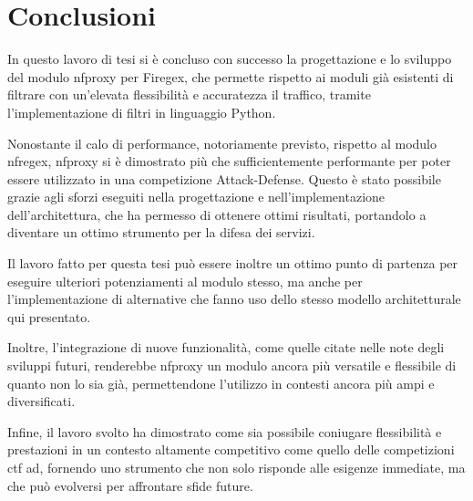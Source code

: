 \chapter*{Conclusioni}\label{chap:ending}

In questo lavoro di tesi si è concluso con successo la progettazione e lo sviluppo del modulo \gls{nfproxy} per Firegex, che permette rispetto ai moduli già esistenti di filtrare con un'elevata flessibilità e accuratezza il traffico, tramite l'implementazione di filtri in linguaggio Python.

Nonostante il calo di performance, notoriamente previsto, rispetto al modulo \gls{nfregex}, \gls{nfproxy} si è dimostrato più che sufficientemente performante per poter essere utilizzato in una competizione Attack-Defense. Questo è stato possibile grazie agli sforzi eseguiti nella progettazione e nell'implementazione dell'architettura, che ha permesso di ottenere ottimi risultati, portandolo a diventare un ottimo strumento per la difesa dei servizi.

Il lavoro fatto per questa tesi può essere inoltre un ottimo punto di partenza per eseguire ulteriori potenziamenti al modulo stesso, ma anche per l'implementazione di alternative che fanno uso dello stesso modello architetturale qui presentato.

Inoltre, l'integrazione di nuove funzionalità, come quelle citate nelle note degli sviluppi futuri, renderebbe \gls{nfproxy} un modulo ancora più versatile e flessibile di quanto non lo sia già, permettendone l'utilizzo in contesti ancora più ampi e diversificati.

Infine, il lavoro svolto ha dimostrato come sia possibile coniugare flessibilità e prestazioni in un contesto altamente competitivo come quello delle competizioni \gls{ctf} \gls{ad}, fornendo uno strumento che non solo risponde alle esigenze immediate, ma che può evolversi per affrontare sfide future.

